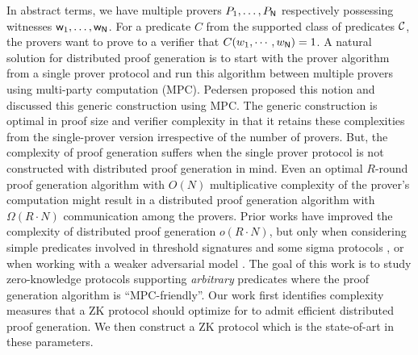 In abstract terms, we have multiple provers $P_1, \ldots, P_{\mathsf{N}}$ respectively possessing witnesses $\mathsf{w}_1, \ldots, \mathsf{w}_{\mathsf{N}}$. For a predicate $C$ from the supported class of predicates ${\cal C}$, the provers want to prove to a verifier that $C(w_1,\cdots,w_{\mathsf{N}}) = 1$.
A natural solution for distributed proof generation is to start with the prover algorithm from a single prover protocol and run this algorithm between multiple provers using multi-party computation (MPC). Pedersen \cite{Ped92} proposed this notion and discussed this generic construction using MPC.
The generic construction is optimal in proof size and verifier complexity in that it retains these complexities from the single-prover version irrespective of the number of provers. But, the complexity of proof generation suffers when the single prover protocol is not constructed with distributed proof generation in mind. Even an optimal $R$-round proof generation algorithm with $O(N)$ multiplicative complexity of the prover's computation  might result in a distributed proof generation algorithm with $\Omega(R \cdot N)$ communication among the provers.
Prior works have improved the complexity of distributed proof generation $o(R \cdot N)$, but only when considering simple predicates involved in threshold signatures \cite{DDS} and some sigma protocols \cite{EfficientTZ}, or when working with a weaker adversarial model \cite{trinocchio}.
The goal of this work is to study zero-knowledge protocols supporting \textit{arbitrary} predicates where the proof generation algorithm is ``MPC-friendly''. %
Our work first identifies complexity measures that a ZK protocol should optimize for to admit efficient distributed proof generation. We then construct a ZK protocol which is the state-of-art in these parameters.

